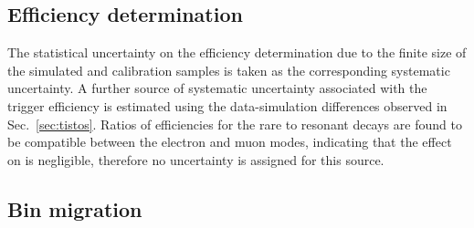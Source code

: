 \subsection{Efficiency determination}

The statistical uncertainty on the efficiency determination due to the finite size of the simulated 
and calibration samples is taken as the corresponding systematic uncertainty.
%
A further source of systematic uncertainty associated with the trigger efficiency is estimated using the data-simulation
differences observed in Sec.~\ref{sec:tistos}. Ratios of efficiencies for the rare to resonant decays are found to be 
compatible between the electron and muon modes, indicating that the effect on \RKst is negligible, 
therefore no uncertainty is assigned for this source.


\subsection{Bin migration}

